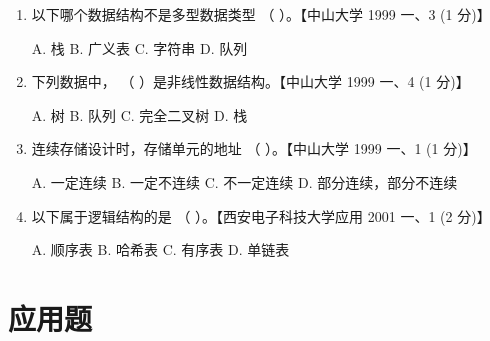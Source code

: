 \documentclass[lang=cn,newtx,10pt,scheme=chinese]{elegantbook}
\begin{document}
\begin{enumerate}
    \item 以下哪个数据结构不是多型数据类型 （ \quad）。【中山大学 1999 一、3 (1 分)】  
    
    A. 栈 \quad B. 广义表 \quad C. 字符串 \quad D. 队列

    \item 下列数据中， （ \quad）是非线性数据结构。【中山大学 1999 一、4 (1 分)】  
    
    A. 树 \quad B. 队列 \quad C. 完全二叉树 \quad D. 栈

    \item 连续存储设计时，存储单元的地址 （ \quad）。【中山大学 1999 一、1 (1 分)】  
   
    A. 一定连续 \quad B. 一定不连续 \quad C. 不一定连续 \quad D. 部分连续，部分不连续

    \item 以下属于逻辑结构的是 （ \quad）。【西安电子科技大学应用 2001 一、1 (2 分)】  
   
    A. 顺序表 \quad B. 哈希表 \quad C. 有序表 \quad D. 单链表
\end{enumerate}

\section{应用题}
\end{document}
